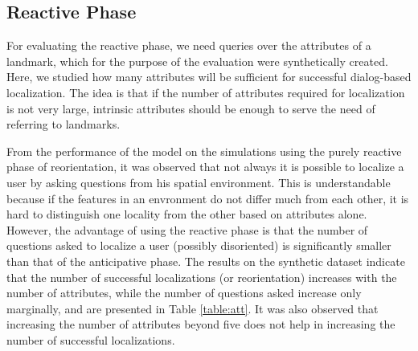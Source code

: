 \documentclass{iitkthesis}
\begin{document}
\subsection*{Reactive Phase}
For evaluating the reactive phase, we need queries over the attributes of 
a landmark, which for the purpose of the evaluation were synthetically 
created. Here, we studied how many attributes will be sufficient 
for successful dialog-based localization. The idea is that if the 
number of attributes required for localization is not very large, 
intrinsic attributes should be enough to serve the need of referring to 
landmarks.

From the performance of the model on the simulations using the purely 
reactive phase of reorientation, it was observed that not always it is 
possible to localize a user by asking questions from his spatial 
environment. This is understandable because if the features in an 
envronment do not differ much from each other, it is hard to distinguish 
one locality from the other based on attributes alone. However, the 
advantage of using the reactive phase is that the number of questions asked 
to localize a user (possibly disoriented) is significantly smaller than 
that of the anticipative phase. The results on the synthetic dataset indicate 
that the number of successful localizations (or reorientation) increases 
with the number of attributes, while the number of questions asked 
increase only marginally, and are presented in Table \ref{table:att}. It 
was also observed that increasing the number of attributes beyond five 
does not help in increasing the number of successful localizations. 
\end{document}
